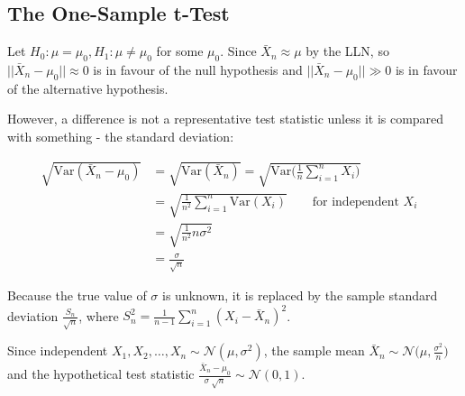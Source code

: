 \subsection{The One-Sample t-Test}

\begin{paracol}{2}

Let $H_0: \mu = \mu_0, H_1: \mu \neq \mu_0$ for some $\mu_0$. Since $\bar{X}_n \approx \mu$ by the LLN, so $|| \bar{X}_n - \mu_0 || \approx 0$ is in favour of the null hypothesis and $|| \bar{X}_n - \mu_0 || \gg 0$ is in favour of the alternative hypothesis.

However, a difference is not a representative test statistic unless it is compared with something - the standard deviation:

\begin{align*}
    \sqrt{\text{Var}(\bar{X}_n - \mu_0)} & = \sqrt{\text{Var}(\bar{X}_n)} = \sqrt{\text{Var}\Big( \frac{1}{n} \sum_{i=1}^n X_i \Big)} & \\
    & = \sqrt{\frac{1}{n^2} \sum_{i=1}^n \text{Var}(X_i)} \qquad \text{for independent $X_i$} \\
    & = \sqrt{\frac{1}{n^2} n \sigma^2} & \\
    & = \frac{\sigma}{\sqrt{n}}
\end{align*}

Because the true value of $\sigma$ is unknown, it is replaced by the sample standard deviation $\frac{S_n}{\sqrt{n}}$, where $S_n^2 = \frac{1}{n-1} \sum_{i=1}^n (X_i - \bar{X}_n)^2$.

\switchcolumn


Since independent $X_1, X_2, \dots, X_n \sim \mathcal{N}(\mu, \sigma^2)$, the sample mean $\bar{X}_n \sim \mathcal{N}\big( \mu, \frac{\sigma^2}{n} \big)$ and the hypothetical test statistic $\frac{\bar{X}_n - \mu_0}{\sigma \ \sqrt{n}} \sim \mathcal{N}(0, 1)$.


\end{paracol}
